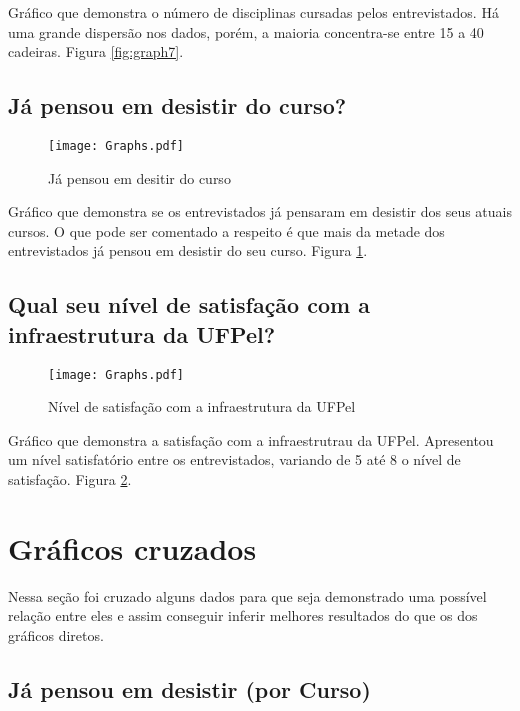 \documentclass[11pt]{scrartcl} %
\begin{document}
Gráfico que demonstra o número de disciplinas cursadas pelos entrevistados. Há uma grande dispersão nos dados, porém, a maioria concentra-se entre 15 a 40 cadeiras. Figura \ref{fig:graph7}.

\subsection{Já pensou em desistir do curso?}

\begin{figure}[h]
  \centering
  \texttt{[image: Graphs.pdf]}
  \label{fig:graph8}
  \caption{Já pensou em desitir do curso}
\end{figure}

Gráfico que demonstra se os entrevistados já pensaram em desistir dos seus atuais cursos. O que pode ser comentado a respeito é que mais da metade dos entrevistados já pensou em desistir do seu curso. Figura \ref{fig:graph8}.

\subsection{Qual seu nível de satisfação com a infraestrutura da UFPel?}

\begin{figure}[h]
  \centering
  \texttt{[image: Graphs.pdf]}
  \label{fig:graph9}
  \caption{Nível de satisfação com a infraestrutura da UFPel}
\end{figure}

Gráfico que demonstra a satisfação com a infraestrutrau da UFPel. Apresentou um nível satisfatório entre os entrevistados, variando de 5 até 8 o nível de satisfação. Figura \ref{fig:graph9}.


\section{Gráficos cruzados}

Nessa seção foi cruzado alguns dados para que seja demonstrado uma possível relação entre eles e assim conseguir inferir melhores resultados do que os dos gráficos diretos.

\subsection{Já pensou em desistir (por Curso)}
\end{document}
